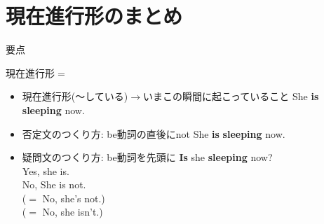 \documentclass[aspectratio=169,xcolor={dvipsnames,table}]{beamer}
\begin{document}
\section{現在進行形のまとめ}
\begin{frame}[plain]{要点}
 
\begin{block}{現在進行形$=$\,\,}
\begin{itemize}[square]\small
 \item<2-> 現在進行形(〜している)$\longrightarrow$いまこの瞬間に起こっていること%
\hfill{She {\bfseries is sleeping} now.}
 \item<3-> 否定文のつくり方: be動詞の直後にnot
\hfill{}{She {\bfseries is}  {\bfseries sleeping} now.}
 \item<4-> 疑問文のつくり方: be動詞を先頭に
\hfill{}{{\bfseries Is} she {\bfseries sleeping} now?}\\
\hfill{}Yes, she is.\\
\hfill{}No, She is not.\\
\hfill{}($=$ No, she's not.)\\
\hfill{}($=$ No, she isn't.)
\end{itemize}
\end{block}
\hfill{}
\end{frame}
\end{document}
